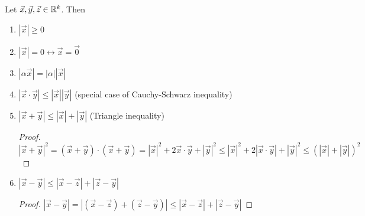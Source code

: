 \begin{theorem}
	Let $\vec{x},\vec{y}, \vec{z} \in \mathbb{R}^{k} $. Then
	\begin{enumerate}[label=(\alph*)]
		\item $|\vec{x}|\ge 0$
		\item $|\vec{x}|=0 \leftrightarrow \vec{x}=\vec{0}$
		\item $|\alpha \vec{x}|=|\alpha| |\vec{x}|$
		\item $|\vec{x} \cdot \vec{y}|\le |\vec{x}||\vec{y}|$ (special case of Cauchy-Schwarz inequality)
		\item $|\vec{x}+\vec{y}|\le |\vec{x}|+|\vec{y}|$ (Triangle inequality)
		      \begin{proof}
			      $|\vec{x}+\vec{y}|^2=(\vec{x}+\vec{y})\cdot (\vec{x}+\vec{y})=
				      |\vec{x}|^2 + 2 \vec{x} \cdot \vec{y}+|\vec{y}|^2
				      \le |\vec{x}|^2 + 2 |\vec{x} \cdot \vec{y}|+|\vec{y}|^2
				      \le (|\vec{x}|+|\vec{y}|)^2
			      $
		      \end{proof}
		\item $|\vec{x}-\vec{y}|\le |\vec{x}-\vec{z}|+|\vec{z} -\vec{y}|$
		      \begin{proof}
			      $|\vec{x}-\vec{y}|=
				      |(\vec{x}-\vec{z})+(\vec{z}-\vec{y})| \le |\vec{x}-\vec{z}|+|\vec{z}-\vec{y}|
			      $
		      \end{proof}
	\end{enumerate}
\end{theorem}
